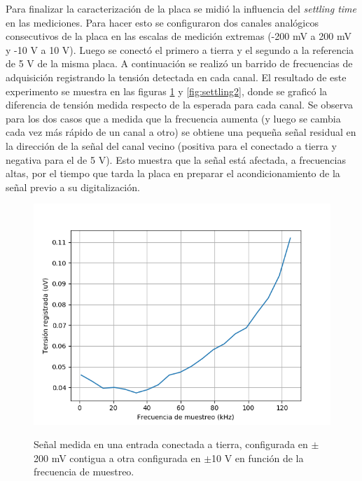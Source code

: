 \documentclass[a4paper,11pt]{article}
\begin{document}
Para finalizar la caracterización de la placa se midió la influencia del \textit{settling time} en las mediciones. Para hacer esto se configuraron dos canales analógicos consecutivos de la placa en las escalas de medición extremas (-200 mV a 200 mV y -10 V a 10 V). Luego se conectó el primero a tierra y el segundo a la referencia de 5 V de la misma placa. A continuación se realizó un barrido de frecuencias de adquisición registrando la tensión detectada en cada canal. El resultado de este experimento se muestra en las figuras \ref{fig:settling1} y \ref{fig:settling2}, donde se graficó la diferencia de tensión medida respecto de la esperada para cada canal. Se observa para los dos casos que a medida que la frecuencia aumenta (y luego se cambia cada vez más rápido de un canal a otro) se obtiene una pequeña señal residual en la dirección de la señal del canal vecino (positiva para el conectado a tierra y negativa para el de 5 V). Esto muestra que la señal está afectada, a frecuencias altas, por el tiempo que tarda la placa en preparar el acondicionamiento de la señal previo a su digitalización.  

\begin{figure}[h!]
\centering
\includegraphics[width=\columnwidth]{figs/settling0V.png}
\label{fig:settling1}
\caption{Señal medida en una entrada conectada a tierra, configurada en $\pm$200 mV contigua a otra configurada en $\pm$10 V en función de la frecuencia de muestreo.}
\end{figure}
\end{document}
